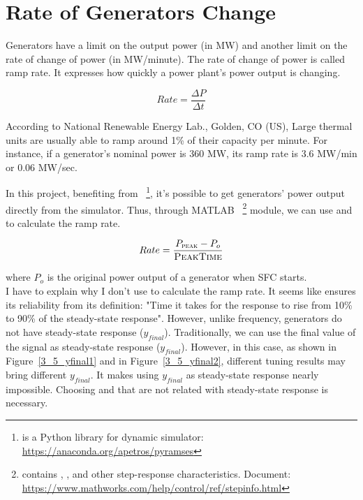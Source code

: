 \section{Rate of Generators Change} %
\label{section3.5}
Generators have a limit on the output power (in MW) and another limit on the rate of change of power (in MW/minute). The rate of change of power is called ramp rate. It expresses how quickly a power plant's power output is changing. 

\begin{equation}
    Rate = \frac{\Delta P}{\Delta t}
\end{equation}


According to National Renewable Energy Lab., Golden, CO (US), \cite{osti_15016292} Large thermal units are usually able to ramp around 1\% of their capacity per minute. For instance, if a generator's nominal power is 360 MW, its ramp rate is 3.6 MW/min or 0.06 MW/sec.

In this project, benefiting from ~\footnote{ is a Python library for  dynamic simulator: \href{https://anaconda.org/apetros/pyramses}{https://anaconda.org/apetros/pyramses}}, it's possible to get generators' power output directly from the simulator. Thus, through MATLAB ~\footnote{ contains , , and other step-response characteristics. Document: \href{https://www.mathworks.com/help/control/ref/stepinfo.html}{https://www.mathworks.com/help/control/ref/stepinfo.html}} module, we can use  and  to calculate the ramp rate.

\begin{equation}
    Rate = \frac{P_{\textsc{peak}} - P_o}{\textsc{PeakTime}}
\end{equation}

where $P_o$ is the original power output of a generator when SFC starts.\\

I have to explain why I don't use  to calculate the ramp rate. It seems like  ensures its reliability from its definition: "Time it takes for the response to rise from 10\% to 90\% of the steady-state response". However, unlike frequency, generators do not have steady-state response ($y_{final}$). Traditionally, we can use the final value of the signal as steady-state response ($y_{final}$). However, in this case, as shown in Figure~\ref{3_5_yfinal1} and in Figure~\ref{3_5_yfinal2}, different tuning results may bring different $y_{final}$. It makes using $y_{final}$ as steady-state response nearly impossible. Choosing  and  that are not related with steady-state response is necessary.

